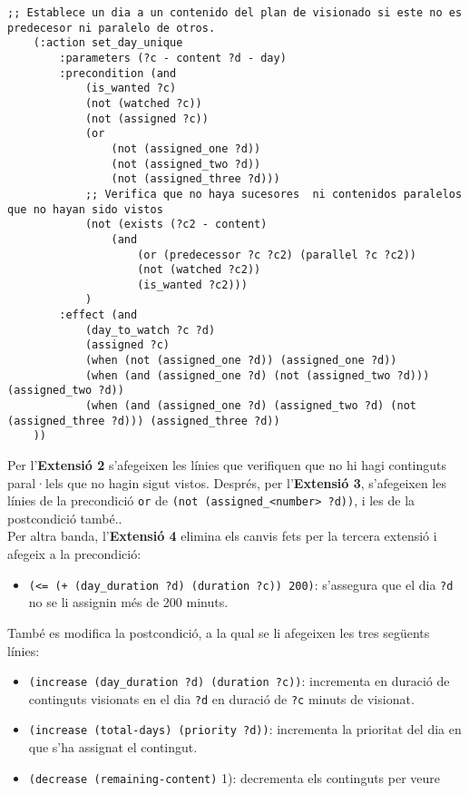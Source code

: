 \documentclass[a4paper]{article}
\begin{document}
	\begin{lstlisting}[language=PDDL, caption={Acció set\_day\_unique}, label={lst:set_day_unique}]
	;; Establece un dia a un contenido del plan de visionado si este no es predecesor ni paralelo de otros.
 	(:action set_day_unique
		:parameters (?c - content ?d - day)
		:precondition (and 
			(is_wanted ?c)
			(not (watched ?c))
			(not (assigned ?c))
			(or 
				(not (assigned_one ?d))
				(not (assigned_two ?d))
				(not (assigned_three ?d)))
			;; Verifica que no haya sucesores  ni contenidos paralelos que no hayan sido vistos
			(not (exists (?c2 - content)         
				(and 
					(or (predecessor ?c ?c2) (parallel ?c ?c2))
					(not (watched ?c2))
					(is_wanted ?c2)))
			)
		:effect (and 
			(day_to_watch ?c ?d)
			(assigned ?c)
			(when (not (assigned_one ?d)) (assigned_one ?d))
			(when (and (assigned_one ?d) (not (assigned_two ?d))) (assigned_two ?d))
			(when (and (assigned_one ?d) (assigned_two ?d) (not (assigned_three ?d))) (assigned_three ?d))
	))
	\end{lstlisting}
	
	\noindent Per l'\textbf{Extensió 2} s'afegeixen les línies que verifiquen que no hi hagi continguts paral·lels que no hagin sigut vistos. Després, per l'\textbf{Extensió 3}, s'afegeixen les línies de la precondició \texttt{or} de \texttt{(not (assigned\_<number> ?d))}, i les de la postcondició també.. \\
	
	\noindent Per altra banda, l'\textbf{Extensió 4} elimina els canvis fets per la tercera extensió i afegeix a la precondició:
	
	\begin{itemize}[label={}, leftmargin=1.5em, itemsep=0pt]
		\item \texttt{(<= (+ (day\_duration ?d) (duration ?c)) 200)}: s'assegura que el dia \texttt{?d} no se li assignin més de 200 minuts. \\
	\end{itemize}
	
	\noindent També es modifica la postcondició, a la qual se li afegeixen les tres següents línies:
	
	\begin{itemize}[label={}, leftmargin=1.5em, itemsep=0pt]
		\item \texttt{(increase (day\_duration ?d) (duration ?c))}: incrementa en duració de continguts visionats en el dia \texttt{?d} en duració de \texttt{?c} minuts de visionat.
		
		\item \texttt{(increase (total-days) (priority ?d))}: incrementa la prioritat del dia en que s'ha assignat el contingut.
		
		\item \texttt{(decrease (remaining-content)} 1): decrementa els continguts per veure
	\end{itemize}
	
\end{document}
